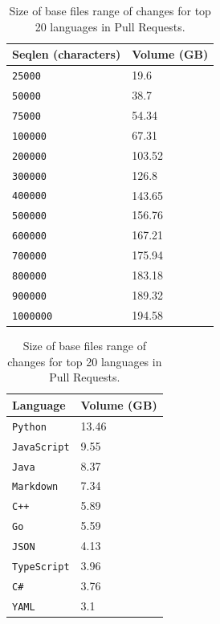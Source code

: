 \documentclass[10pt]{article} %
\begin{document}
\begin{table}
\centering
\begin{adjustbox}{valign=t}
\begin{minipage}[t]{0.45\textwidth}
\caption{Volume of the pull requests dataset when we restrict the sequence length.}
\label{tab:pr_render_sizes} 
\centering
\begin{tabular}{ll}
\toprule
\textbf{Seqlen (characters)} & \textbf{Volume (GB)}\\
\midrule
\verb|25000| & 19.6  \\ 
\verb|50000| & 38.7  \\ 
\verb|75000| & 54.34  \\ 
\verb|100000| & 67.31  \\ 
\verb|200000| & 103.52  \\ 
\verb|300000| & 126.8  \\ 
\verb|400000| & 143.65  \\ 
\verb|500000| & 156.76  \\ 
\verb|600000| & 167.21  \\ 
\verb|700000| & 175.94  \\ 
\verb|800000| & 183.18  \\ 
\verb|900000| & 189.32  \\ 
\verb|1000000| & 194.58  \\  
\bottomrule
\end{tabular}
\end{minipage}
\end{adjustbox}
\hfill
\begin{adjustbox}{valign=t}
\begin{minipage}[t]{0.45\textwidth}
\caption{Size of base files range of changes for top 20 languages in Pull Requests.}
\label{tab:pr_lang_sizes} 
\centering
\begin{tabular}{ll}
\toprule
\textbf{Language} & \textbf{Volume (GB)}\\
\midrule
\verb|Python| & 13.46  \\ 
\verb|JavaScript| & 9.55  \\ 
\verb|Java| & 8.37  \\ 
\verb|Markdown| & 7.34  \\ 
\verb|C++| & 5.89  \\ 
\verb|Go| & 5.59  \\ 
\verb|JSON| & 4.13  \\ 
\verb|TypeScript| & 3.96  \\ 
\verb|C#| & 3.76  \\ 
\verb|YAML| & 3.1  \\ 

\end{tabular}
\end{minipage}
\end{adjustbox}
\end{table}
\end{document}
